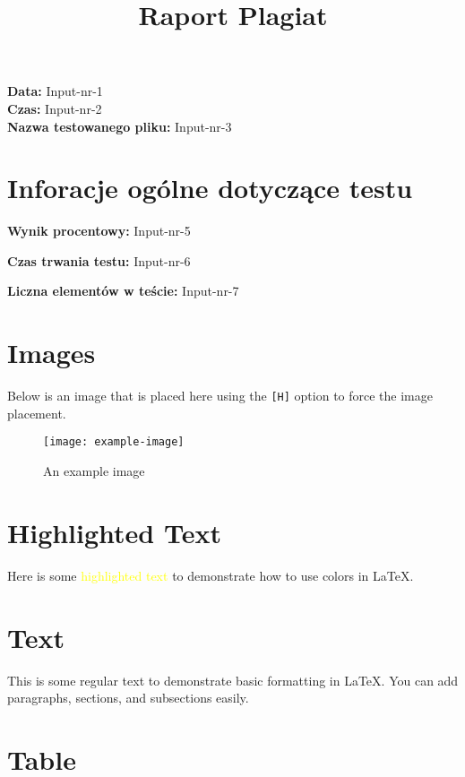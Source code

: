 \documentclass{article}
\title{Raport Plagiat}
\date{}
\begin{document}
\maketitle

\begin{center}
    \textbf{Data:} Input-nr-1 \\
    \textbf{Czas:} Input-nr-2 \\
    \textbf{Nazwa testowanego pliku:} Input-nr-3
\end{center}

\section{Inforacje ogólne dotyczące testu}

\textbf{Wynik procentowy:} \textcolor{Input-nr-4}{ Input-nr-5 }

\textbf{Czas trwania testu:} Input-nr-6

\textbf{Liczna elementów w teście:} Input-nr-7


\section{Images}

Below is an image that is placed here using the \texttt{[H]} option to force the image placement.

\begin{figure}[H]
\centering
\texttt{[image: example-image]} %
\caption{An example image}
\end{figure}

\section{Highlighted Text}

Here is some \textcolor{yellow}{highlighted text} to demonstrate how to use colors in LaTeX.

\section{Text}

This is some regular text to demonstrate basic formatting in LaTeX. You can add paragraphs, sections, and subsections easily.

\section{Table}
\end{document}
